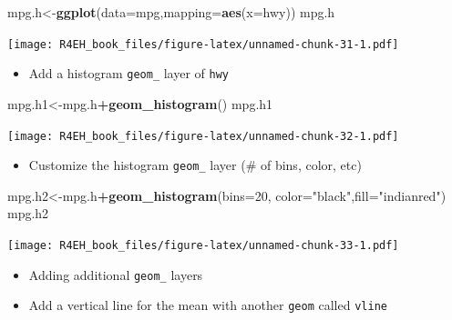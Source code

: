 \documentclass[]{book}
\newenvironment{Shaded}{\begin{snugshade}}{\end{snugshade}}
\newcommand{\KeywordTok}[1]{\textcolor[rgb]{0.13,0.29,0.53}{\textbf{#1}}}
\newcommand{\DataTypeTok}[1]{\textcolor[rgb]{0.13,0.29,0.53}{#1}}
\newcommand{\DecValTok}[1]{\textcolor[rgb]{0.00,0.00,0.81}{#1}}
\newcommand{\StringTok}[1]{\textcolor[rgb]{0.31,0.60,0.02}{#1}}
\newcommand{\OperatorTok}[1]{\textcolor[rgb]{0.81,0.36,0.00}{\textbf{#1}}}
\newcommand{\NormalTok}[1]{#1}
\providecommand{\tightlist}{%
  \setlength{\itemsep}{0pt}\setlength{\parskip}{0pt}}
\theoremstyle{definition}
\theoremstyle{definition}
\theoremstyle{definition}
\theoremstyle{remark}
\begin{document}
\begin{Shaded}
\begin{Highlighting}[]
\NormalTok{mpg.h<-}\KeywordTok{ggplot}\NormalTok{(}\DataTypeTok{data=}\NormalTok{mpg,}\DataTypeTok{mapping=}\KeywordTok{aes}\NormalTok{(}\DataTypeTok{x=}\NormalTok{hwy))}
\NormalTok{mpg.h}
\end{Highlighting}
\end{Shaded}

\texttt{[image: R4EH\_book\_files/figure-latex/unnamed-chunk-31-1.pdf]}

\begin{itemize}
\tightlist
\item
  Add a histogram \texttt{geom\_} layer of \texttt{hwy}
\end{itemize}

\begin{Shaded}
\begin{Highlighting}[]
\NormalTok{mpg.h1<-mpg.h}\OperatorTok{+}\KeywordTok{geom_histogram}\NormalTok{()}
\NormalTok{mpg.h1}
\end{Highlighting}
\end{Shaded}

\texttt{[image: R4EH\_book\_files/figure-latex/unnamed-chunk-32-1.pdf]}

\begin{itemize}
\tightlist
\item
  Customize the histogram \texttt{geom\_} layer (\# of bins, color, etc)
\end{itemize}

\begin{Shaded}
\begin{Highlighting}[]
\NormalTok{mpg.h2<-mpg.h}\OperatorTok{+}\KeywordTok{geom_histogram}\NormalTok{(}\DataTypeTok{bins=}\DecValTok{20}\NormalTok{, }\DataTypeTok{color=}\StringTok{"black"}\NormalTok{,}\DataTypeTok{fill=}\StringTok{"indianred"}\NormalTok{)}
\NormalTok{mpg.h2}
\end{Highlighting}
\end{Shaded}

\texttt{[image: R4EH\_book\_files/figure-latex/unnamed-chunk-33-1.pdf]}

\begin{itemize}
\item
  Adding additional \texttt{geom\_} layers
\item
  Add a vertical line for the mean with another \texttt{geom} called
  \texttt{vline}
\end{itemize}
\end{document}
